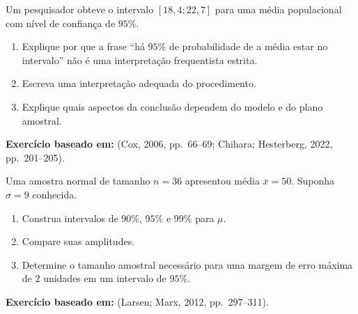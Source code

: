 \documentclass[
  letterpaper,
  DIV=11,
  numbers=noendperiod]{scrreprt}
\providecommand{\tightlist}{%
  \setlength{\itemsep}{0pt}\setlength{\parskip}{0pt}}\usepackage{longtable,booktabs,array}
\begin{document}
\begin{tcolorbox}[enhanced jigsaw, colback=white, leftrule=.75mm, colbacktitle=quarto-callout-note-color!10!white, breakable, titlerule=0mm, bottomtitle=1mm, title=\textcolor{quarto-callout-note-color}{\faInfo}\hspace{0.5em}{Exercício 1 --- interpretação}, colframe=quarto-callout-note-color-frame, toprule=.15mm, opacityback=0, bottomrule=.15mm, opacitybacktitle=0.6, arc=.35mm, toptitle=1mm, rightrule=.15mm, coltitle=black, left=2mm]

Um pesquisador obteve o intervalo \([18{,}4;22{,}7]\) para uma média
populacional com nível de confiança de \(95\%\).

\begin{enumerate}
\def\labelenumi{\arabic{enumi}.}
\tightlist
\item
  Explique por que a frase ``há \(95\%\) de probabilidade de a média
  estar no intervalo'' não é uma interpretação frequentista estrita.
\item
  Escreva uma interpretação adequada do procedimento.
\item
  Explique quais aspectos da conclusão dependem do modelo e do plano
  amostral.
\end{enumerate}

\textbf{Exercício baseado em:} (Cox, 2006, pp.~66--69; Chihara;
Hesterberg, 2022, pp.~201--205).

\end{tcolorbox}

\begin{tcolorbox}[enhanced jigsaw, colback=white, leftrule=.75mm, colbacktitle=quarto-callout-note-color!10!white, breakable, titlerule=0mm, bottomtitle=1mm, title=\textcolor{quarto-callout-note-color}{\faInfo}\hspace{0.5em}{Exercício 2 --- média com variância conhecida}, colframe=quarto-callout-note-color-frame, toprule=.15mm, opacityback=0, bottomrule=.15mm, opacitybacktitle=0.6, arc=.35mm, toptitle=1mm, rightrule=.15mm, coltitle=black, left=2mm]

Uma amostra normal de tamanho \(n=36\) apresentou média
\(\overline x=50\). Suponha \(\sigma=9\) conhecida.

\begin{enumerate}
\def\labelenumi{\arabic{enumi}.}
\tightlist
\item
  Construa intervalos de \(90\%\), \(95\%\) e \(99\%\) para \(\mu\).
\item
  Compare suas amplitudes.
\item
  Determine o tamanho amostral necessário para uma margem de erro máxima
  de \(2\) unidades em um intervalo de \(95\%\).
\end{enumerate}

\textbf{Exercício baseado em:} (Larsen; Marx, 2012, pp.~297--311).

\end{tcolorbox}
\end{document}
